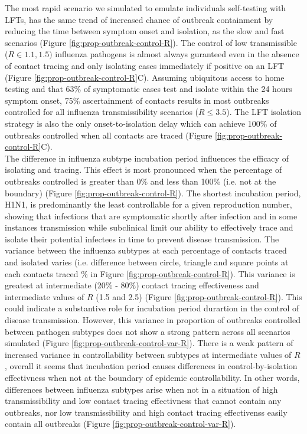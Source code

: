 \documentclass{article}
\begin{document}
The most rapid scenario we simulated to emulate individuals self-testing with LFTs, has the same trend of increased chance of outbreak containment by reducing the time between symptom onset and isolation, as the slow and fast scenarios (Figure \ref{fig:prop-outbreak-control-R}). The control of low transmissible ($R \in {1.1, 1.5})$ influenza pathogens is almost always guranteed even in the absence of contact tracing and only isolating cases immediately if positive on an LFT (Figure \ref{fig:prop-outbreak-control-R}C). Assuming ubiquitous access to home testing and that 63\% of symptomatic cases test and isolate within the 24 hours symptom onset, 75\% ascertainment of contacts results in most outbreaks controlled for all influenza transmissibility scenarios ($R \leq 3.5$). The LFT isolation strategy is also the only onset-to-isolation delay which can achieve 100\% of outbreaks controlled when all contacts are traced (Figure \ref{fig:prop-outbreak-control-R}C). \\

The difference in influenza subtype incubation period influences the efficacy of isolating and tracing. This effect is most pronounced when the percentage of outbreaks controlled is greater than 0\% and less than 100\% (i.e. not at the boundary) (Figure \ref{fig:prop-outbreak-control-R}). The shortest incubation period, H1N1, is predominantly the least controllable for a given reproduction number, showing that infections that are symptomatic shortly after infection and in some instances transmission while subclinical limit our ability to effectively trace and isolate their potential infectees in time to prevent disease transmission. The variance between the influenza subtypes at each percentage of contacts traced and isolated varies (i.e. difference between circle, triangle and square points at each contacts traced \% in Figure \ref{fig:prop-outbreak-control-R}). This variance is greatest at intermediate (20\% - 80\%) contact tracing effectiveness and intermediate values of $R$ (1.5 and 2.5) (Figure \ref{fig:prop-outbreak-control-R}). This could indicate a substantive role for incubation period durartion in the control of disease transmission. However, this variance in proportion of outbreaks controlled between pathogen subtypes does not show a strong pattern across all scenarios simulated (Figure \ref{fig:prop-outbreak-control-var-R}). There is a weak pattern of increased variance in controllability between subtypes at intermediate values of $R$, overall it seems that incubation period causes differences in control-by-isolation effectivness when not at the boundary of epidemic controllability. In other words, differences between influenza subtypes arise when not in a situation of high transmissibility and low contact tracing effectivness that cannot contain any outbreaks, nor low transmissibility and high contact tracing effectivenss easily contain all outbreaks (Figure \ref{fig:prop-outbreak-control-var-R}). \\
\end{document}
